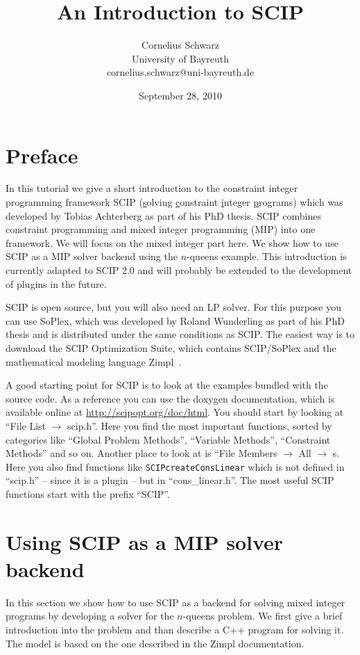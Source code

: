 \documentclass[a4paper]{article}
\title{An Introduction to SCIP}
\author{Cornelius Schwarz \\ University of Bayreuth \\ cornelius.schwarz@uni-bayreuth.de}
\date{September 28, 2010}
\begin{document}
\maketitle

\section{Preface}

In this tutorial we give a short introduction to the constraint integer programming framework SCIP
(\underline{s}olving \underline{c}onstraint \underline{i}nteger \underline{p}rograms) which was developed
by Tobias Achterberg \cite{scip} as part of his PhD thesis. SCIP combines constraint programming and mixed
integer programming (MIP) into one framework. We will focus on the mixed integer part here.
We show how to use SCIP as a MIP solver backend using the $n$-queens example.
This introduction is currently adapted to SCIP 2.0 and will probably be extended to the development of
plugins in the future.

SCIP is open source, but you will also need an LP solver. For this purpose you can use SoPlex,
which was developed by Roland Wunderling \cite{soplex} as part of his PhD thesis and is distributed under
the same conditions as SCIP. The easiest way is to download the SCIP Optimization Suite, which contains
SCIP/SoPlex and the mathematical modeling language Zimpl~\cite{zimpl}.

A good starting point for SCIP is to look at the examples bundled with the source code. As a reference you
can use the doxygen documentation, which is available online at \url{http://scipopt.org/doc/html}.
You should start by looking at ``File List $\rightarrow$ scip.h''. Here you find the most important functions,
sorted by categories like ``Global Problem Methods'', ``Variable Methods'', ``Constraint Methods'' and so on.
Another place to look at is ``File Members $\rightarrow$ All $\rightarrow$ s. Here you also find functions like
\verb+SCIPcreateConsLinear+ which is not defined in ``scip.h'' -- since it is a plugin -- but in
``cons\_linear.h''. The most useful SCIP functions start with the prefix ``SCIP''.


\section{Using SCIP as a MIP solver backend}

In this section we show how to use SCIP as a backend for solving mixed integer programs by developing a solver
for the $n$-queens problem. We first give a brief introduction into the problem and than describe a C++ program
for solving it. The model is based on the one described in the Zimpl documentation.
\end{document}
